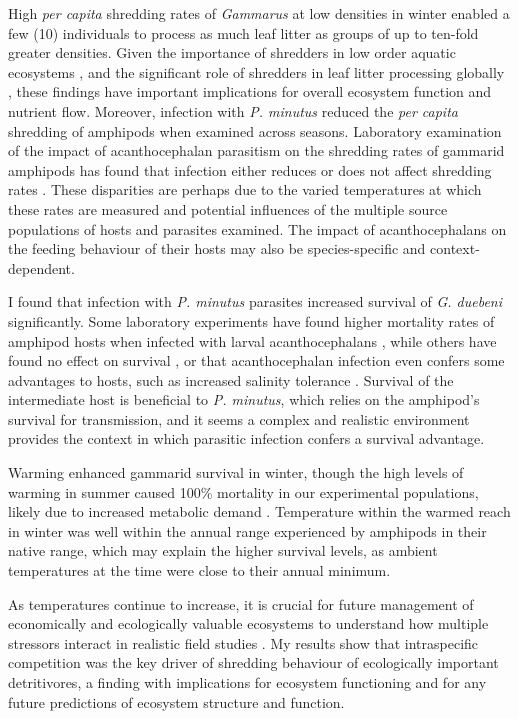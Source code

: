 High \emph{per capita} shredding rates of \emph{Gammarus} at low densities in winter enabled a few (10) individuals to process as much leaf litter as groups of up to ten-fold greater densities. Given the importance of shredders in low order aquatic ecosystems \citep{vannote1980}, and the significant role of shredders in leaf litter processing globally \citep{petersen1974}, these findings have important implications for overall ecosystem function and nutrient flow. Moreover, infection with \emph{P. minutus} reduced the \emph{per capita} shredding of amphipods when examined across seasons. Laboratory examination of the impact of acanthocephalan parasitism on the shredding rates of gammarid amphipods has found that infection either reduces \citep{agatz2014, labaude2016} or does not affect shredding rates \citep{fielding2003, Chapter 2}. These disparities are perhaps due to the varied temperatures at which these rates are measured and potential influences of the multiple source populations of hosts and parasites examined. The impact of acanthocephalans on the feeding behaviour of their hosts may also be species-specific and context-dependent. 

I found that infection with \emph{P. minutus} parasites increased survival of \emph{G. duebeni} significantly. Some laboratory experiments have found higher mortality rates of amphipod hosts when infected with larval acanthocephalans \citep{brown1989, labaude2015influence}, while others have found no effect on survival \citep{chen2015}, or that acanthocephalan infection even confers some advantages to hosts, such as increased salinity tolerance \citep{piscart2007}. Survival of the intermediate host is beneficial to \emph{P. minutus}, which relies on the amphipod’s survival for transmission, and it seems a complex and realistic environment provides the context in which parasitic infection confers a survival advantage.  

Warming enhanced gammarid survival in winter, though the high levels of warming in summer caused 100\% mortality in our experimental populations, likely due to increased metabolic demand \citep{galic2017}. Temperature within the warmed reach in winter was well within the annual range experienced by amphipods in their native range, which may explain the higher survival levels, as ambient temperatures at the time were close to their annual minimum. 

As temperatures continue to increase, it is crucial for future management of economically and ecologically valuable ecosystems to understand how multiple stressors interact in realistic field studies \citep{ogorman2014, jackson2016}. My results show that intraspecific competition was the key driver of shredding behaviour of ecologically important detritivores, a finding with implications for ecosystem functioning and for any future predictions of ecosystem structure and function. 
